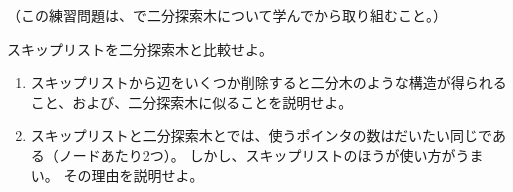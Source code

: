 \begin{exc}
  （この練習問題は、で二分探索木について学んでから取り組むこと。）

  スキップリストを二分探索木と比較せよ。
  \begin{enumerate}
     \item スキップリストから辺をいくつか削除すると二分木のような構造が得られること、および、二分探索木に似ることを説明せよ。
     \item スキップリストと二分探索木とでは、使うポインタの数はだいたい同じである（ノードあたり2つ）。
	 しかし、スキップリストのほうが使い方がうまい。
	 その理由を説明せよ。
  \end{enumerate}
\end{exc}

